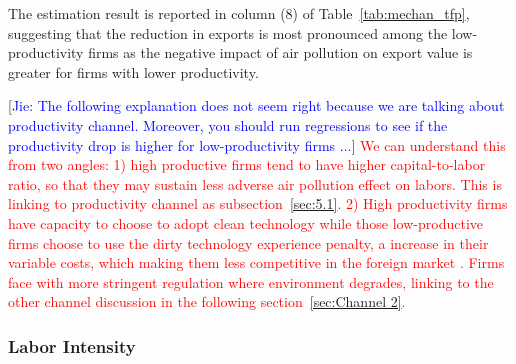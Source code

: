 \documentclass[12pt]{article}
\begin{document}
The estimation result is reported in column (8) of Table~\ref{tab:mechan_tfp}, suggesting that the reduction in exports is most pronounced among the low-productivity firms as the negative impact of air pollution on export value is greater for firms with lower productivity. 

[\textcolor{blue}{Jie: The following explanation does not seem right because we are talking about productivity channel. Moreover, you should run regressions to see if the productivity drop is higher for low-productivity firms ...}] \textcolor{red}{We can understand this from two angles: 1) high productive firms tend to have higher capital-to-labor ratio, so that they may sustain less adverse air pollution effect on labors. This is linking to productivity channel as subsection~\ref{sec:5.1}. 2) High productivity firms have capacity to choose to adopt clean technology while those low-productive firms choose to use the dirty technology experience penalty, a increase in their variable costs, which making them less competitive in the foreign market \citep{cherniwchan2022environmental}. Firms face with more stringent regulation where environment degrades, linking to the other channel discussion in the following section~\ref{sec:Channel 2}.}


\subsubsection{Labor Intensity}
\end{document}
